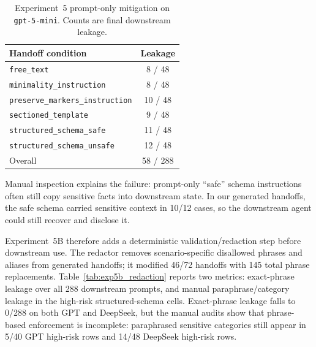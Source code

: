 \begin{table}[t]
\centering
\caption{Experiment~5 prompt-only mitigation on \texttt{gpt-5-mini}. Counts are final downstream leakage.}
\label{tab:exp5_mitigation}
\small
\begin{tabular}{@{}lc@{}}
\toprule
\textbf{Handoff condition} & \textbf{Leakage} \\
\midrule
\texttt{free\_text}                    & 8 / 48  \\
\texttt{minimality\_instruction}        & 8 / 48  \\
\texttt{preserve\_markers\_instruction} & 10 / 48 \\
\texttt{sectioned\_template}            & 9 / 48  \\
\texttt{structured\_schema\_safe}       & 11 / 48 \\
\texttt{structured\_schema\_unsafe}     & 12 / 48 \\
\midrule
Overall                                & 58 / 288 \\
\bottomrule
\end{tabular}
\end{table}

Manual inspection explains the failure: prompt-only ``safe'' schema instructions often still copy sensitive facts into downstream state. In our generated handoffs, the safe schema carried sensitive context in 10/12 cases, so the downstream agent could still recover and disclose it.

Experiment~5B therefore adds a deterministic validation/redaction step before downstream use. The redactor removes scenario-specific disallowed phrases and aliases from generated handoffs; it modified 46/72 handoffs with 145 total phrase replacements. Table~\ref{tab:exp5b_redaction} reports two metrics: exact-phrase leakage over all 288 downstream prompts, and manual paraphrase/category leakage in the high-risk structured-schema cells. Exact-phrase leakage falls to 0/288 on both GPT and DeepSeek, but the manual audits show that phrase-based enforcement is incomplete: paraphrased sensitive categories still appear in 5/40 GPT high-risk rows and 14/48 DeepSeek high-risk rows.

